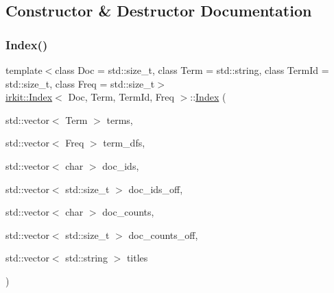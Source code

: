 \subsection{Constructor \& Destructor Documentation}
\mbox{\label{classirkit_1_1Index_a42309f5d0a921f9663fa3980a3122839}} 
\subsubsection{\texorpdfstring{Index()}{Index()}\hspace{0.1cm}{\footnotesize\ttfamily [1/2]}}
{\footnotesize\ttfamily template$<$class Doc  = std\+::size\+\_\+t, class Term  = std\+::string, class Term\+Id  = std\+::size\+\_\+t, class Freq  = std\+::size\+\_\+t$>$ \\
\hyperlink{classirkit_1_1Index}{irkit\+::\+Index}$<$ Doc, Term, Term\+Id, Freq $>$\+::\hyperlink{classirkit_1_1Index}{Index} (\begin{DoxyParamCaption}\item[{std\+::vector$<$ Term $>$}]{terms,  }\item[{std\+::vector$<$ Freq $>$}]{term\+\_\+dfs,  }\item[{std\+::vector$<$ char $>$}]{doc\+\_\+ids,  }\item[{std\+::vector$<$ std\+::size\+\_\+t $>$}]{doc\+\_\+ids\+\_\+off,  }\item[{std\+::vector$<$ char $>$}]{doc\+\_\+counts,  }\item[{std\+::vector$<$ std\+::size\+\_\+t $>$}]{doc\+\_\+counts\+\_\+off,  }\item[{std\+::vector$<$ std\+::string $>$}]{titles }\end{DoxyParamCaption})\hspace{0.3cm}{\ttfamily [inline]}}

\mbox{\label{classirkit_1_1Index_ac5cba6928ec1e67be4f59089b3a51b89}} 

